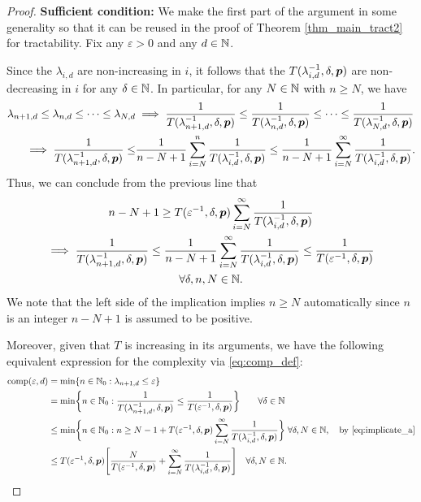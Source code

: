 \documentclass[sort&compress]{elsarticle}
\newcommand{\thed}{\delta}
\begin{document}
\begin{proof}
\textbf{Sufficient condition:}\newline
We make the first part of the argument in some generality so that it can be reused in the proof of Theorem \ref{thm_main_tract2} for tractability.  Fix any $\varepsilon > 0$ and any $d \in \mathbb{N}$.

Since the $\lambda_{i,d}$ are non-increasing in $i$, it follows that the $T(\lambda_{i,d}^{-1},\thed,\vp)$ are non-decreasing in $i$ for any $\thed\in\naturals$. In particular, for  any $N\in\mathbb{N}$ with $n\ge N$, we have
\begin{align*}
    \lambda_{n+1,d} \le \lambda_{n,d} \le \cdots \le \lambda_{N,d}
    & \implies \frac{1}{T(\lambda_{n+1, d}^{-1},\thed,\vp)} \le \frac{1}{T(\lambda_{n, d}^{-1},\thed,\vp)} \le \cdots \le \frac{1}{T(\lambda_{N, d}^{-1},\thed,\vp)} \\
     \implies \frac{1}{T(\lambda_{n+1, d}^{-1},\thed,\vp) }
    \le &\frac{1}{n-N+1} \sum_{i=N}^n  \frac{1}{T(\lambda_{i, d}^{-1},\thed,\vp) }
    \le \frac{1}{n-N+1} \sum_{i=N}^\infty  \frac{1}{T(\lambda_{i, d}^{-1},\thed,\vp)}.
\end{align*}
Thus, we can conclude from the previous line that
\begin{multline} \label{eq:implicate_a}
    n - N +1 \ge T(\varepsilon^{-1},\thed,\vp) \sum_{i=N}^\infty \frac{1}{T(\lambda_{i, d}^{-1},\thed,\vp)} \\
   \implies   \frac{1}{T(\lambda_{n+1, d}^{-1},\thed,\vp)} \le
   \frac{1}{n-N+1} \sum_{i=N}^\infty \frac{1}{T(\lambda_{i, d}^{-1},\thed,\vp) } \le \frac{1}{T(\varepsilon^{-1},\thed,\vp)} \\ \forall \thed, n, N \in \naturals.
\end{multline}
We note that the left side of the implication implies $n \ge N$ automatically since $n$ is an integer  $n - N +1$ is assumed to be positive.

Moreover, given that $T$ is increasing in its arguments, we have the following equivalent expression for the complexity via \eqref{eq:comp_def}:
\begin{align} %
	\nonumber
	\comp(\varepsilon, d) & = \min \{n \in \natzero : \lambda_{n+1, d} \le \varepsilon\} \\
	\nonumber
	& = \min \biggl\{n \in \natzero : \frac{1}{T(\lambda_{n+1,d}^{-1},\thed,\vp)}\le \frac{1}{T(\varepsilon^{-1},\thed,\vp) }\biggr\} \qquad  \forall \thed\in \naturals\\
	\nonumber
	& \le  \min \biggl\{n \in \natzero : n \ge N - 1 + T(\varepsilon^{-1},\thed,\vp) \sum_{i=N}^\infty \frac{1}{T(\lambda_{i, d}^{-1},\thed,\vp)} \biggr\} \;  \forall  \thed, N \in \naturals, \quad \text{by \eqref{eq:implicate_a}} \\ 
	& \le  T(\varepsilon^{-1},\thed,\vp) \Biggl [\frac{N}{T(\varepsilon^{-1},\thed,\vp)}  +  \sum_{i=N}^\infty \frac{1}{T(\lambda_{i, d}^{-1},\thed,\vp)} \Biggr] \quad \forall  \thed, N \in \naturals. \label{eq:compUP}
\end{align}


\end{proof}
\end{document}
